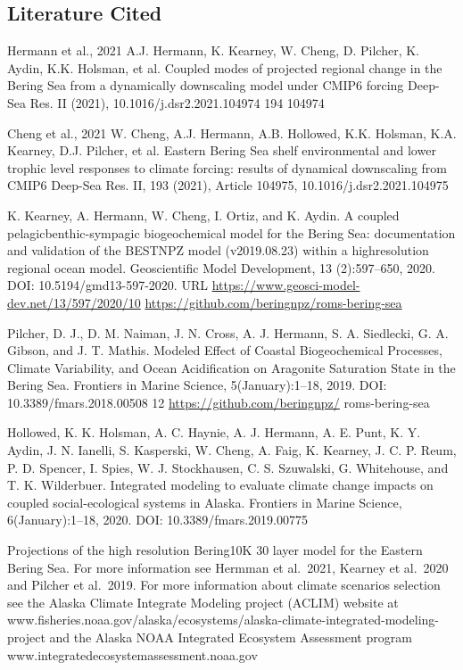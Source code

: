 \documentclass[
]{article}
\begin{document}
\hypertarget{literature-cited}{%
\subsection{Literature Cited}\label{literature-cited}}

Hermann et al., 2021 A.J. Hermann, K. Kearney, W. Cheng, D. Pilcher, K.
Aydin, K.K. Holsman, et al. Coupled modes of projected regional change
in the Bering Sea from a dynamically downscaling model under CMIP6
forcing Deep-Sea Res. II (2021), 10.1016/j.dsr2.2021.104974 194 104974

Cheng et al., 2021 W. Cheng, A.J. Hermann, A.B. Hollowed, K.K. Holsman,
K.A. Kearney, D.J. Pilcher, et al. Eastern Bering Sea shelf
environmental and lower trophic level responses to climate forcing:
results of dynamical downscaling from CMIP6 Deep-Sea Res. II, 193
(2021), Article 104975, 10.1016/j.dsr2.2021.104975

K. Kearney, A. Hermann, W. Cheng, I. Ortiz, and K. Aydin. A coupled
pelagicbenthic-sympagic biogeochemical model for the Bering Sea:
documentation and validation of the BESTNPZ model (v2019.08.23) within a
highresolution regional ocean model. Geoscientific Model Development, 13
(2):597--650, 2020. DOI: 10.5194/gmd13-597-2020. URL
\url{https://www.geosci-model-dev.net/13/597/2020/10}
\url{https://github.com/beringnpz/roms-bering-sea}

Pilcher, D. J., D. M. Naiman, J. N. Cross, A. J. Hermann, S. A.
Siedlecki, G. A. Gibson, and J. T. Mathis. Modeled Effect of Coastal
Biogeochemical Processes, Climate Variability, and Ocean Acidification
on Aragonite Saturation State in the Bering Sea. Frontiers in Marine
Science, 5(January):1--18, 2019. DOI: 10.3389/fmars.2018.00508 12
\url{https://github.com/beringnpz/} roms-bering-sea

Hollowed, K. K. Holsman, A. C. Haynie, A. J. Hermann, A. E. Punt, K. Y.
Aydin, J. N. Ianelli, S. Kasperski, W. Cheng, A. Faig, K. Kearney, J. C.
P. Reum, P. D. Spencer, I. Spies, W. J. Stockhausen, C. S. Szuwalski, G.
Whitehouse, and T. K. Wilderbuer. Integrated modeling to evaluate
climate change impacts on coupled social-ecological systems in Alaska.
Frontiers in Marine Science, 6(January):1--18, 2020. DOI:
10.3389/fmars.2019.00775

Projections of the high resolution Bering10K 30 layer model for the
Eastern Bering Sea. For more information see Hermman et al.~2021,
Kearney et al.~2020 and Pilcher et al.~2019. For more information about
climate scenarios selection see the Alaska Climate Integrate Modeling
project (ACLIM) website at
www.fisheries.noaa.gov/alaska/ecosystems/alaska-climate-integrated-modeling-project
and the Alaska NOAA Integrated Ecosystem Assessment program
www.integratedecosystemassessment.noaa.gov
\end{document}
